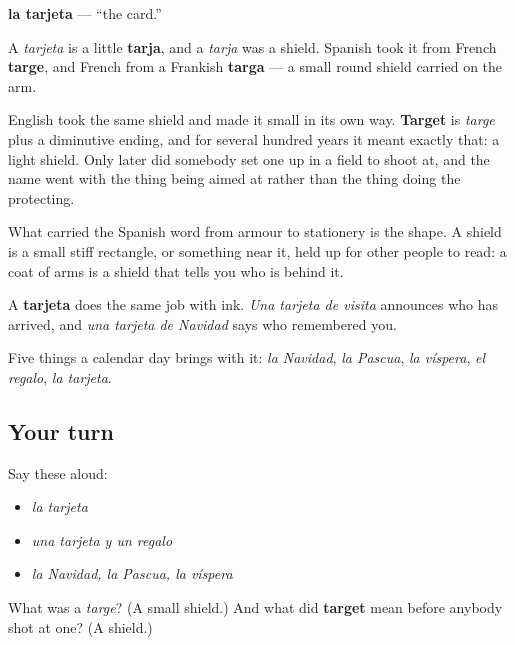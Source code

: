 \begin{cousinweb}
\textbf{la tarjeta} — \textquotedblleft{}the card.\textquotedblright{}

A \emph{tarjeta} is a little \textbf{tarja}, and a \emph{tarja} was a shield. Spanish took it from French \textbf{targe}, and French from a Frankish \textbf{targa} — a small round shield carried on the arm.

English took the same shield and made it small in its own way. \textbf{Target} is \emph{targe} plus a diminutive ending, and for several hundred years it meant exactly that: a light shield. Only later did somebody set one up in a field to shoot at, and the name went with the thing being aimed at rather than the thing doing the protecting.

What carried the Spanish word from armour to stationery is the shape. A shield is a small stiff rectangle, or something near it, held up for other people to read: a coat of arms is a shield that tells you who is behind it.

A \textbf{tarjeta} does the same job with ink. \emph{Una tarjeta de visita} announces who has arrived, and \emph{una tarjeta de Navidad} says who remembered you.
\end{cousinweb}

\begin{grammarlens}[title={What you've built}]
Five things a calendar day brings with it: \emph{la Navidad}, \emph{la Pascua}, \emph{la víspera}, \emph{el regalo}, \emph{la tarjeta}.
\end{grammarlens}

\subsection*{Your turn}
Say these aloud:

\begin{itemize}
\raggedright
  \item \emph{la tarjeta}
  \item \emph{una tarjeta y un regalo}
  \item \emph{la Navidad, la Pascua, la víspera}
\end{itemize}

\begin{tcolorbox}[breakable,colback=teal!4,colframe=teal!35!black,title={Before you move on}]
What was a \emph{targe}? (A small shield.) And what did \textbf{target} mean before anybody shot at one? (A shield.)
\end{tcolorbox}
